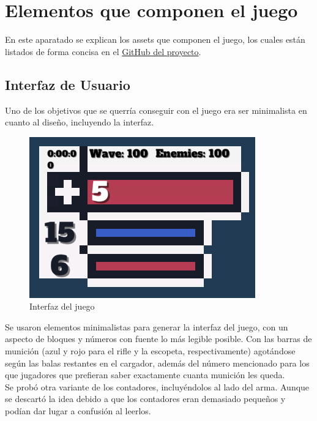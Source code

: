 \documentclass[12pt]{article}
\begin{document}
\section{Elementos que componen el juego}
    En este aparatado se explican los assets que componen el juego, los cuales están listados de forma concisa en el \href{https://github.com/JesusJMUJI/TopDownShooterGame}{GitHub del proyecto}. 
    
    \subsection{Interfaz de Usuario}
        Uno de los objetivos que se querría conseguir con el juego era ser minimalista en cuanto al diseño, incluyendo la interfaz.  
        \begin{figure}[H]
            \centering
            \includegraphics[scale = 0.7]{Images/UI.png}
            \caption{Interfaz del juego}
            \label{fig:UI}
        \end{figure}
        
        Se usaron elementos minimalistas para generar la interfaz del juego, con un aspecto de bloques y números con fuente lo más legible posible. Con las barras de munición (azul y rojo para el rifle y la escopeta, respectivamente) agotándose según las balas restantes en el cargador, además del número mencionado para los que jugadores que prefieran saber exactamente cuanta munición les queda.\\
        
        Se probó otra variante de los contadores, incluyéndolos al lado del arma. Aunque se descartó la idea debido a que los contadores eran demasiado pequeños y podían dar lugar a confusión al leerlos.\\
        
\end{document}
